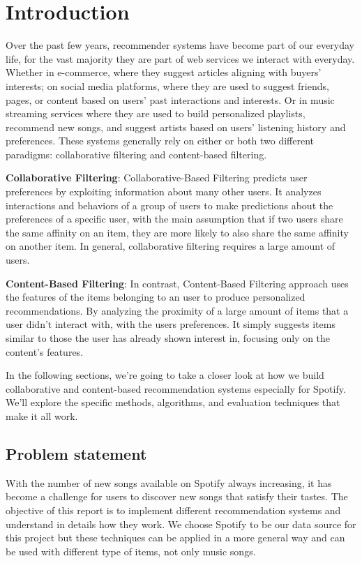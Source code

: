 \chapter{Introduction} \label{chap:introduction}
Over the past few years, recommender systems have become part of our everyday life, for the vast majority they are part of web services we interact with everyday. Whether in e-commerce, where they suggest articles aligning with buyers' interests; on social media platforms, where they are used to suggest friends, pages, or content based on users' past interactions and interests. Or in music streaming services where they are used to build personalized playlists, recommend new songs, and suggest artists based on users' listening history and preferences. These systems generally rely on either or both two different paradigms: collaborative filtering and content-based filtering.

\textbf{Collaborative Filtering}:
Collaborative-Based Filtering predicts user preferences by exploiting information about many other users. It analyzes interactions and behaviors of a group of users to make predictions about the preferences of a specific user, with the main assumption that if two users share the same affinity on an item, they are more likely to also share the same affinity on another item. In general, collaborative filtering requires a large amount of users.

\textbf{Content-Based Filtering}:
In contrast, Content-Based Filtering approach uses the features of the items belonging to an user to produce personalized recommendations. By analyzing the proximity of  a large amount of items that a user didn't interact with, with the users preferences. It simply suggests items similar to those the user has already shown interest in, focusing only on the content's features. 

In the following sections, we're going to take a closer look at how we build collaborative and content-based recommendation systems especially for Spotify. We'll explore the specific methods, algorithms, and evaluation techniques that make it all work.

\section{Problem statement}
With the number of new songs available on Spotify always increasing, it has become a challenge for users to discover new songs that satisfy their tastes. The objective of this report is to implement different recommendation systems and understand in details how they work. We choose Spotify to be our data source for this project but these techniques can be applied in a more general way and can be used with different type of items, not only music songs.

